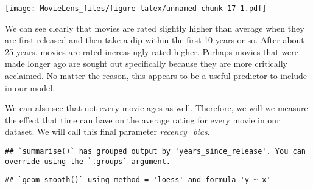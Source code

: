 \documentclass[
]{article}
\newenvironment{Shaded}{\begin{snugshade}}{\end{snugshade}}
\newcommand{\DataTypeTok}[1]{\textcolor[rgb]{0.13,0.29,0.53}{#1}}
\newcommand{\DecValTok}[1]{\textcolor[rgb]{0.00,0.00,0.81}{#1}}
\newcommand{\KeywordTok}[1]{\textcolor[rgb]{0.13,0.29,0.53}{\textbf{#1}}}
\newcommand{\NormalTok}[1]{#1}
\newcommand{\OperatorTok}[1]{\textcolor[rgb]{0.81,0.36,0.00}{\textbf{#1}}}
\newcommand{\StringTok}[1]{\textcolor[rgb]{0.31,0.60,0.02}{#1}}
\begin{document}
\texttt{[image: MovieLens\_files/figure-latex/unnamed-chunk-17-1.pdf]}

We can see clearly that movies are rated slightly higher than average
when they are first released and then take a dip within the first 10
years or so. After about 25 years, movies are rated increasingly rated
higher. Perhaps movies that were made longer ago are sought out
specifically because they are more critically acclaimed. No matter the
reason, this appears to be a useful predictor to include in our model.

We can also see that not every movie ages as well. Therefore, we will we
measure the effect that time can have on the average rating for every
movie in our dataset. We will call this final parameter
\emph{recency\_bias}.

\begin{Shaded}
\end{Shaded}

\begin{verbatim}
## `summarise()` has grouped output by 'years_since_release'. You can override using the `.groups` argument.
\end{verbatim}

\begin{verbatim}
## `geom_smooth()` using method = 'loess' and formula 'y ~ x'
\end{verbatim}
\end{document}
